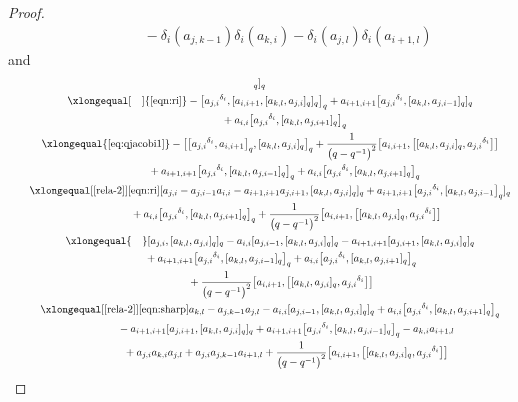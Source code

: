 \documentclass[pdftex]{sigma}
\numberwithin{equation}{section}
\def\d{\delta}
\begin{document}
\begin{proof}
\begin{gather*}
\qquad\qquad {}-\d_i (a_{j,k-1} )\d_i (a_{k,i} ) -\d_i (a_{j, l} ) \d_i (a_{i+1, l} )
\end{gather*}
and
\begin{gather*}
 [\d_i(a_{j,i}), [\d_i (a_{k,l} ),\d_i(a_{j,i}) ]_q ]_q \\
 \qquad\xlongequal[\quad]{\eqref{eqn:ri}} - \bigl[{a_{j,i}}^{\d_i}, [a_{i,i+1}, [a_{k,l},a_{j,i} ]_q ]_q \bigr]_q + a_{i+1,i+1} \bigl[{a_{j,i}}^{\d_i}, [a_{k,l},a_{j,i-1} ]_q ]_q \\
\qquad\qquad\ \ {}+ a_{i,i} \bigl[{a_{j,i}}^{\d_i}, [a_{k,l},a_{j,i+1} ]_q \bigr]_q \\
 \qquad\xlongequal{\eqref{eq:qjacobi1}} - \bigl[ \bigl[{a_{j,i}}^{\d_i},a_{i,i+1} \bigr]_q, [a_{k,l},a_{j,i} ]_q \bigr]_q +\frac{1}{\bigl(q-q^{-1}\bigr)^2} \bigl[a_{i,i+1}, \bigl[ [a_{k,l},a_{j,i} ]_q, {a_{j,i}}^{\d_i} \bigr] \bigr]\\
\qquad\qquad \ \ {}+ a_{i+1,i+1} \bigl[{a_{j,i}}^{\d_i}, [a_{k,l},a_{j,i-1} ]_q \bigr]_q + a_{i,i} \bigl[{a_{j,i}}^{\d_i}, [a_{k,l},a_{j,i+1} ]_q \bigr]_q \\
\qquad \xlongequal[\eqref{rela-2}]{\eqref{eqn:ri}} [a_{j,i}-a_{j,i-1}a_{i,i}-a_{i+1,i+1}a_{j,i+1}, [a_{k,l},a_{j,i} ]_q ]_q + a_{i+1,i+1} \bigl[{a_{j,i}}^{\d_i}, [a_{k,l},a_{j,i-1} \bigr]_q ]_q \\
\qquad\qquad \quad {}+ a_{i,i} \bigl[{a_{j,i}}^{\d_i}, [a_{k,l},a_{j,i+1} ]_q \bigr]_q +\frac{1}{\bigl(q-q^{-1}\bigr)^2} \bigl[a_{i,i+1}, \bigl[ [a_{k,l},a_{j,i} ]_q, {a_{j,i}}^{\d_i} \bigr] \bigr]\\
\qquad \xlongequal{\quad} [a_{j,i}, [a_{k,l},a_{j,i} ]_q ]_q -a_{i,i} [a_{j,i-1}, [a_{k,l},a_{j,i} ]_q ]_q-a_{i+1,i+1} [a_{j,i+1}, [a_{k,l},a_{j,i} ]_q ]_q\\
 \qquad\qquad {}+ a_{i+1,i+1} \bigl[{a_{j,i}}^{\d_i}, [a_{k,l},a_{j,i-1} ]_q \bigr]_q + a_{i,i} \bigl[{a_{j,i}}^{\d_i}, [a_{k,l},a_{j,i+1} ]_q \bigr]_q\\
 \qquad\qquad {}+\frac{1}{\bigl(q-q^{-1}\bigr)^2} \bigl[a_{i,i+1}, \bigl[ [a_{k,l},a_{j,i} ]_q,{a_{j,i}}^{\d_i} \bigr] \bigr] \\
\qquad \xlongequal[\eqref{rela-2}]{\eqref{eqn:sharp}} a_{k,l}-a_{j,k-1}a_{j,l}-a_{i,i} [a_{j,i-1}, [a_{k,l},a_{j,i} ]_q ]_q+ a_{i,i} \bigl[{a_{j,i}}^{\d_i}, [a_{k,l},a_{j,i+1} ]_q \bigr]_q \\
 \qquad\qquad\quad {}-a_{i+1,i+1} [a_{j,i+1}, [a_{k,l},a_{j,i} ]_q ]_q+ a_{i+1,i+1} \bigl[{a_{j,i}}^{\d_i}, [a_{k,l},a_{j,i-1} ]_q \bigr]_q-a_{k,i}a_{i+1,l}\\
 \qquad\qquad\quad {}+a_{j,i}a_{k,i}a_{j,l}+a_{j,i}a_{j,k-1}a_{i+1,l} +\frac{1}{\bigl(q-q^{-1}\bigr)^2} \bigl[a_{i,i+1}, \bigl[ [a_{k,l},a_{j,i} ]_q, {a_{j,i}}^{\d_i} \bigr] \bigr]\\

\end{gather*}
\end{proof}
\end{document}
